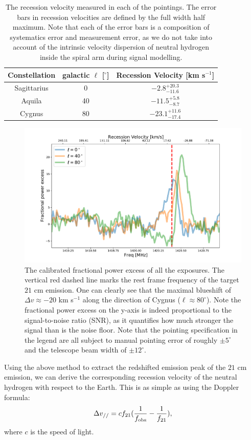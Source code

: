 \documentclass[12pt]{article}
\begin{document}
    \begin{table}
    \centering
    \begin{tabular}{c|c|c}
            Constellation & galactic $\ell$ [$^\circ$] & Recession Velocity [km s$^{-1}$]\\
            \hline \hline
            Sagittarius & 0  & $-2.8^{+20.3}_{-11.6}$ \\
            \hline
            Aquila  & 40 & $-11.5^{+5.8}_{-8.7}$ \\
            \hline
             Cygnus & 80 & $-23.1^{+11.6}_{-17.4}$ \\
             \hline
        \end{tabular}
        \caption{The recession velocity measured in each of the pointings. The error bars in recession velocities are defined by the full width half maximum. Note that each of the error bars is a composition of systematics error and measurement error, as we do not take into account of the intrinsic velocity dispersion of neutral hydrogen inside the spiral arm during signal modelling. }
        \label{tab: recession-velocity}
    \end{table}
    \begin{figure}
	    \centering
	    \includegraphics[width=\textwidth]{plots/mw-21cm-map-2.pdf}
	    \caption{The calibrated fractional power excess of all the exposures. The vertical red dashed line marks the rest frame frequency of the target $21$ cm emission. One can clearly see that the maximal blueshift of $\Delta v \approx -20$ km s$^{-1}$ along the direction of Cygnus ($\ell \approx 80^{\circ}$). Note the fractional power excess on the y-axis is indeed proportional to the signal-to-noise ratio (SNR), as it quantifies how much stronger the signal than is the noise floor. Note that the pointing specification in the legend are all subject to manual pointing error of roughly $\pm 5^\circ$ and the telescope beam width of $\pm 12^\circ$. } 
	    \label{fig: obs-result}
	\end{figure}
    Using the above method to extract the redshifted emission peak of the $21$ cm emission, we can derive the corresponding recession velocity of the neutral hydrogen with respect to the Earth. 
    This is as simple as using the Doppler formula:
    \begin{equation}
        \Delta v_{//} = c f_{\rm 21} (\frac{1}{f_{\rm obs}} - \frac{1}{f_{\rm 21}}),
    \end{equation}
    where $c$ is the speed of light. 
    
\end{document}
